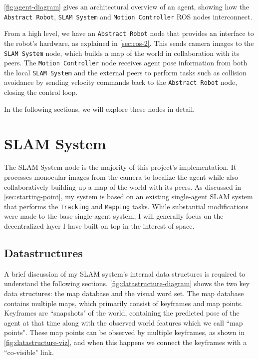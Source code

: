 \autoref{fig:agent-diagram} gives an architectural overview of an agent, showing how the \texttt{Abstract Robot}, \texttt{SLAM System} and \texttt{Motion Controller} ROS nodes interconnect.

From a high level, we have an \texttt{Abstract Robot} node that provides an interface to the robot's hardware, as explained in \autoref{sec:ros-2}. This sends camera images to the \texttt{SLAM System} node, which builds a map of the world in collaboration with its peers. The \texttt{Motion Controller} node receives agent pose information from both the local \texttt{SLAM System} and the external peers to perform tasks such as collision avoidance by sending velocity commands back to the \texttt{Abstract Robot} node, closing the control loop.

In the following sections, we will explore these nodes in detail.

\section{SLAM System}
\label{sec:slam-system}
The SLAM System node is the majority of this project's implementation. It processes monocular images from the camera to localize the agent while also collaboratively building up a map of the world with its peers. As discussed in \autoref{sec:starting-point}, my system is based on an existing single-agent SLAM system that performs the \texttt{Tracking} and \texttt{Mapping} tasks. While substantial modifications were made to the base single-agent system, I will generally focus on the decentralized layer I have built on top in the interest of space.

\subsection{Datastructures}
\label{sec:datastructures}
A brief discussion of my SLAM system's internal data structures is required to understand the following sections. \autoref{fig:datastructure-diagram} shows the two key data structures: the map database and the visual word set. The map database contains multiple maps, which primarily consist of keyframes and map points. Keyframes are ``snapshots" of the world, containing the predicted pose of the agent at that time along with the observed world features which we call ``map points". These map points can be observed by multiple keyframes, as shown in \autoref{fig:datastructure-viz}, and when this happens we connect the keyframes with a ``co-visible" link.

